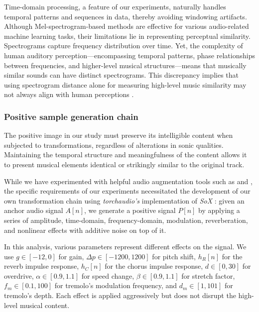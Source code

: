 Time-domain processing, a feature of our experiments, naturally handles temporal patterns and sequences in data, thereby avoiding windowing artifacts. Although Mel-spectrogram-based methods are effective for various audio-related machine learning tasks, their limitations lie in representing perceptual similarity. Spectrograms capture frequency distribution over time. Yet, the complexity of human auditory perception—encompassing temporal patterns, phase relationships between frequencies, and higher-level musical structures—means that musically similar sounds can have distinct spectrograms. This discrepancy implies that using spectrogram distance alone for measuring high-level music similarity may not always align with human perceptions \cite{Kim2020OneStrategies}\cite{Mesostructures2023}.

\subsubsection{Positive sample generation chain}

The positive image in our study must preserve its intelligible content when subjected to transformations, regardless of alterations in sonic qualities. Maintaining the temporal structure and meaningfulness of the content allows it to present musical elements identical or strikingly similar to the original track.

While we have experimented with helpful audio augmentation tools such as \cite{Spijkervet2021Spijkervet/torchaudio-augmentations:V1.0} and \cite{Kharitonov2020DataDomain}, the specific requirements of our experiments necessitated the development of our own transformation chain using \textit{torchaudio's} \cite{Yang2021TorchAudio:Processing} implementation of \textit{SoX} \cite{sox}: given an anchor audio signal $A[n]$, we generate a positive signal $P[n]$ by applying a series of amplitude, time-domain, frequency-domain, modulation, reverberation, and nonlinear effects with additive noise on top of it. 

In this analysis, various parameters represent different effects on the signal. We use $g \in [-12, 0]$ for gain, $\Delta p \in [-1200, 1200]$ for pitch shift, $h_R[n]$ for the reverb impulse response, $h_C[n]$ for the chorus impulse response, $d \in [0, 30]$ for overdrive, $\alpha \in [0.9, 1.1]$ for speed change, $\beta \in [0.9, 1.1]$ for stretch factor, $f_m \in [0.1, 100]$ for tremolo's modulation frequency, and $d_m \in [1, 101]$ for tremolo's depth. Each effect is applied aggressively but does not disrupt the high-level musical content.

